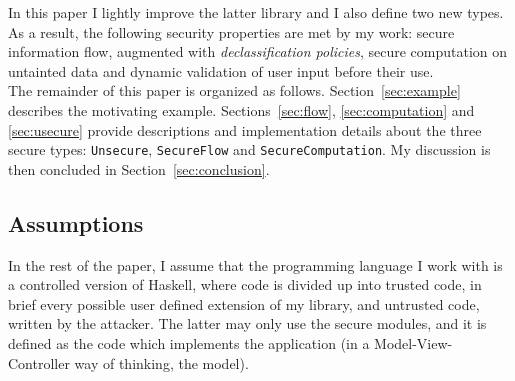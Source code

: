 In this paper I lightly improve the latter library and I also define two new types. As a result, the following security properties are met by my work: secure information flow, augmented with \textit{declassification policies}, secure computation on untainted data and dynamic validation of user input before their use. \\
The remainder of this paper is organized as follows. Section~\ref{sec:example} describes the motivating example. Sections~\ref{sec:flow}, \ref{sec:computation} and \ref{sec:usecure} provide descriptions and implementation details about the three secure types: \texttt{Unsecure}, \texttt{SecureFlow} and \texttt{SecureComputation}. My discussion is then concluded in Section~\ref{sec:conclusion}.

\subsection{Assumptions}
In the rest of the paper, I assume that the programming language I work with is a controlled version of Haskell, where code is divided up into trusted code, in brief every possible user defined extension of my library, and untrusted code, written by the attacker. The latter may only use the secure modules, and it is defined as the code which implements the application (in a Model-View-Controller way of thinking, the model). 